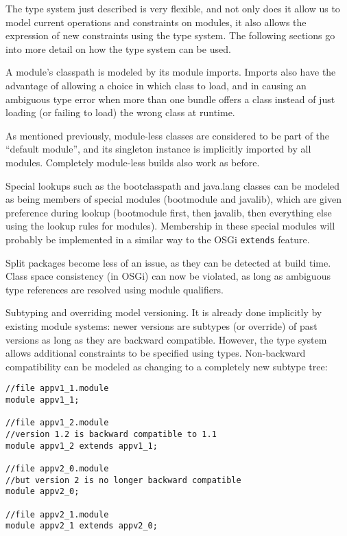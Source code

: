 The type system just described is very flexible, and not only does it
allow us to model current operations and constraints on modules, it also
allows the expression of new constraints using the type system. The following
sections go into more detail on how the type system can be used.


A module's classpath is modeled by its module imports. Imports also have the advantage
of allowing a choice in which class to load, and in causing an
ambiguous type error  when more than one bundle offers
a class instead of just loading (or failing to load) the wrong class at runtime.

As mentioned previously, module-less classes are considered to be part 
of the ``default module'', and its singleton instance is implicitly 
imported by all modules. Completely module-less builds also work as before.

Special lookups such as the bootclasspath and java.lang classes can be
modeled as being members of special modules (bootmodule and javalib), 
which are given preference during lookup (bootmodule first, then javalib,
then everything else using the lookup rules for modules). Membership
in these special modules will probably be implemented in a similar way to
the OSGi \texttt{extends} feature.

Split packages become less of an issue, as they can be detected at
build time. Class space consistency (in OSGi) can now be violated,
as long as ambiguous type references are resolved using module qualifiers.


Subtyping and overriding model versioning. It is already done
implicitly by existing module systems: newer versions are subtypes (or override) of past versions
as long as they are backward compatible.
However, the type system allows additional constraints to be specified using
types. Non-backward compatibility can be modeled as changing to a
completely new subtype tree:

\begin{lstlisting}[caption=Versioning Using Subtyping]
//file appv1_1.module
module appv1_1;

//file appv1_2.module
//version 1.2 is backward compatible to 1.1
module appv1_2 extends appv1_1;

//file appv2_0.module
//but version 2 is no longer backward compatible
module appv2_0; 

//file appv2_1.module
module appv2_1 extends appv2_0;
\end{lstlisting}

